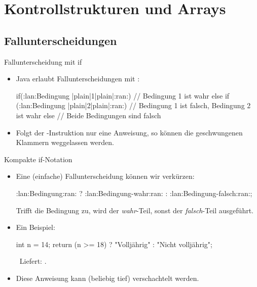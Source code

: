 \section{Kontrollstrukturen und Arrays}
\subsection{Fallunterscheidungen}

\begin{frame}[fragile]{Fallunterscheidung mit if}
    \begin{itemize}[<+(1)->]
        \item Java erlaubt Fallunterscheidungen mit :\pause{}
\begin{plainjava}
if(:lan:Bedingung |plain|1|plain|:ran:) {
    // Bedingung 1 ist wahr
} else if (:lan:Bedingung |plain|2|plain|:ran:) {
    // Bedingung 1 ist falsch, Bedingung 2 ist wahr
} else {
    // Beide Bedingungen sind falsch
}
\end{plainjava}
    \item Folgt der -Instruktion nur eine Anweisung,\pause{} so können die geschwungenen Klammern weggelassen werden.
    \end{itemize}
\end{frame}


\begin{frame}[fragile]{Kompakte if-Notation}
    \begin{itemize}[<+(1)->]
        \widei
        \item Eine (einfache) Fallunterscheidung können wir verkürzen:\pause{}
\begin{plainjava}
:lan:Bedingung:ran: ? :lan:Bedingung-wahr:ran: : :lan:Bedingung-falsch:ran:;
\end{plainjava}
        \pause{}Trifft die Bedingung zu, wird der \emph{wahr}-Teil, sonst der \emph{falsch}-Teil ausgeführt.
        \item Ein Beispiel:\pause{}
\begin{plainjava}
int n = 14;
return (n >= 18) ? "Volljährig" : "Nicht volljährig";
\end{plainjava}
        \pause{}\faAngleRight~Liefert: .
        \item Diese Anweisung kann (beliebig tief) verschachtelt werden.
    \end{itemize}
\end{frame}


